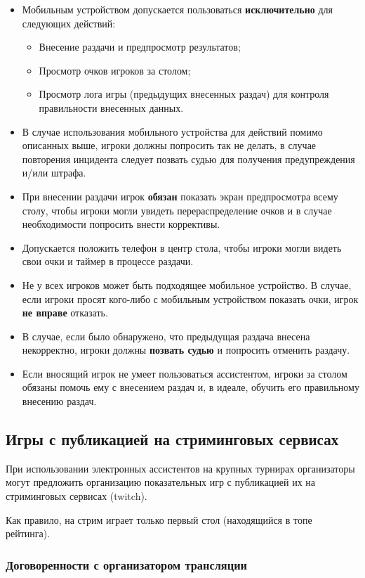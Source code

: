 \begin{itemize}
	\item Мобильным устройством допускается пользоваться \textbf{исключительно} для следующих действий:
	\begin{itemize}
		\item Внесение раздачи и предпросмотр результатов;
		\item Просмотр очков игроков за столом;
		\item Просмотр лога игры (предыдущих внесенных раздач) для контроля правильности внесенных данных.
	\end{itemize}
	\item В случае использования мобильного устройства для действий помимо описанных выше, игроки должны попросить так не делать, в случае повторения инцидента следует позвать судью для получения предупреждения и/или штрафа.
	\item При внесении раздачи игрок \textbf{обязан} показать экран предпросмотра всему столу, чтобы игроки могли увидеть перераспределение очков и в случае необходимости попросить внести коррективы.
	\item Допускается положить телефон в центр стола, чтобы игроки могли видеть свои очки и таймер в процессе раздачи.
	\item Не у всех игроков может быть подходящее мобильное устройство. В случае, если игроки просят кого-либо с мобильным устройством показать очки, игрок \textbf{не вправе} отказать.
	\item В случае, если было обнаружено, что предыдущая раздача внесена некорректно, игроки должны \textbf{позвать судью} и попросить отменить раздачу.
	\item Если вносящий игрок не умеет пользоваться ассистентом, игроки за столом обязаны помочь ему с внесением раздач и, в идеале, обучить его правильному внесению раздач.
\end{itemize}

\subsection{Игры с публикацией на стриминговых сервисах}

При использовании электронных ассистентов на крупных турнирах организаторы могут предложить организацию показательных игр с публикацией их на стриминговых сервисах (twitch).

Как правило, на стрим играет только первый стол (находящийся в топе рейтинга).

\subsubsection{Договоренности с организатором трансляции}

